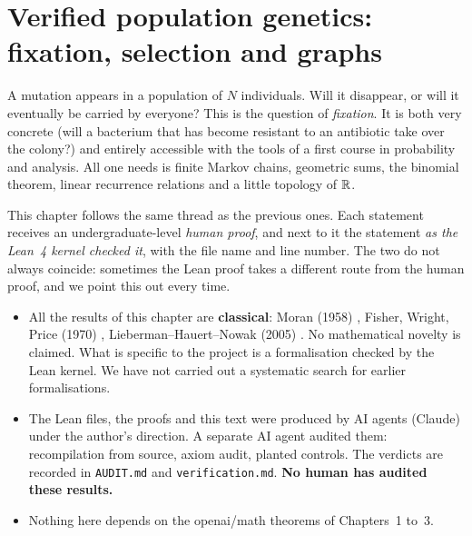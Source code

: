 \chapter{Verified population genetics: fixation, selection and graphs}
\label{ch4:debut}\label{ch4:chapitre}
\sloppy

A mutation appears in a population of $N$ individuals. Will it disappear, or will it eventually be carried by
everyone? This is the question of \emph{fixation}. It is both very concrete (will a bacterium that has become
resistant to an antibiotic take over the colony?) and entirely accessible with the tools of a first course in
probability and analysis. All one needs is finite Markov chains, geometric sums, the binomial theorem, linear
recurrence relations and a little topology of $\mathbb{R}$.

This chapter follows the same thread as the previous ones. Each statement receives an undergraduate-level
\emph{human proof}, and next to it the statement \emph{as the Lean~4 kernel checked it}, with the file name and
line number. The two do not always coincide: sometimes the Lean proof takes a different route from the human
proof, and we point this out every time.

\begin{warnbox}
\begin{itemize}[leftmargin=1.2em,itemsep=1pt]
\item All the results of this chapter are \textbf{classical}: Moran (1958) \cite{ch4:Mor}, Fisher, Wright,
Price (1970) \cite{ch4:Pri70}, Lieberman--Hauert--Nowak (2005) \cite{ch4:LHN}. No mathematical novelty is claimed. What is specific to the project
is a formalisation checked by the Lean kernel. We have not carried out a systematic search for earlier
formalisations.
\item The Lean files, the proofs and this text were produced by AI agents (Claude) under the author's
direction. A separate AI agent audited them: recompilation from source, axiom audit, planted controls. The
verdicts are recorded in \texttt{AUDIT.md} and \texttt{verification.md}.
\textbf{No human has audited these results.}
\item Nothing here depends on the openai/math theorems of Chapters~1 to~3.
\end{itemize}
\end{warnbox}

